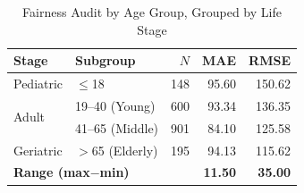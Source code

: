 \documentclass[conference]{IEEEtran}
\begin{document}
\begin{table}[H]
\centering
\caption{Fairness Audit by Age Group, Grouped by Life Stage}
\label{tab:fair_age}
\renewcommand{\arraystretch}{1.15}
\begin{tabular}{p{1.9cm}lrrr}
\toprule
\textbf{Stage} & \textbf{Subgroup} & \textbf{$N$} & \textbf{MAE} & \textbf{RMSE} \\
\midrule
Pediatric     & $\leq$18         & 148 & 95.60 & 150.62 \\
\midrule
\multirow{2}{*}{Adult}
              & 19--40 (Young)   & 600 & 93.34 & 136.35 \\
              & 41--65 (Middle)  & 901 & 84.10 & 125.58 \\
\midrule
Geriatric     & $>$65 (Elderly)  & 195 & 94.13 & 115.62 \\
\midrule
\multicolumn{3}{l}{\textbf{Range (max$-$min)}} & \textbf{11.50} & \textbf{35.00} \\
\bottomrule
\end{tabular}
\end{table}
\end{document}
